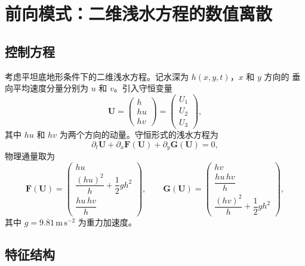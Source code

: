 \documentclass[12pt,a4paper]{article}
\newcommand{\U}{\bm{U}}
\newcommand{\F}{\bm{F}}
\newcommand{\G}{\bm{G}}
\begin{document}
\section{前向模式：二维浅水方程的数值离散}
\label{sec:forward}

\subsection{控制方程}

考虑平坦底地形条件下的二维浅水方程。记水深为 $h(x,y,t)$，$x$ 和 $y$ 方向的
垂向平均速度分量分别为 $u$ 和 $v$。引入守恒变量
\begin{equation}
  \U =
  \begin{pmatrix}
    h \\ hu \\ hv
  \end{pmatrix}
  =
  \begin{pmatrix}
    U_1 \\ U_2 \\ U_3
  \end{pmatrix},
  \label{eq:state}
\end{equation}
其中 $hu$ 和 $hv$ 为两个方向的动量。守恒形式的浅水方程为
\begin{equation}
  \partial_t \U + \partial_x \F(\U) + \partial_y \G(\U) = 0,
  \label{eq:swe}
\end{equation}
物理通量取为
\begin{equation}
  \F(\U) =
  \begin{pmatrix}
    hu \\[2pt]
    \dfrac{(hu)^2}{h} + \dfrac{1}{2}gh^2 \\[8pt]
    \dfrac{hu\,hv}{h}
  \end{pmatrix},
  \qquad
  \G(\U) =
  \begin{pmatrix}
    hv \\[2pt]
    \dfrac{hu\,hv}{h} \\[8pt]
    \dfrac{(hv)^2}{h} + \dfrac{1}{2}gh^2
  \end{pmatrix},
  \label{eq:fluxes}
\end{equation}
其中 $g = 9.81\,\mathrm{m\,s^{-2}}$ 为重力加速度。

\subsection{特征结构}
\end{document}
